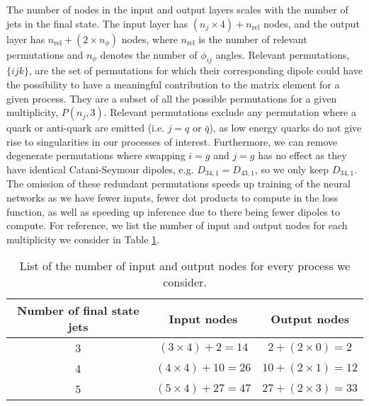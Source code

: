 \documentclass[main.tex]{subfiles}
\begin{document}
The number of nodes in the input and output layers scales with the number of jets in the final state.
The input layer has $(n_{j} \times 4) + n_{\mathrm{rel}}$ nodes, and the output layer has $n_{\mathrm{rel}} + (2 \times n_{\phi})$ nodes, where $n_{\mathrm{rel}}$ is the number of relevant permutations and $n_{\phi}$ denotes the number of $\phi_{ij}$ angles.
Relevant permutations, ${\{ijk\}}$, are the set of permutations for which their corresponding dipole could have the possibility to have a meaningful contribution to the matrix element for a given process.
They are a subset of all the possible permutations for a given multiplicity, $P(n_{j}, 3)$.
Relevant permutations exclude any permutation where a quark or anti-quark are emitted (i.e. $j = q$ or $\bar{q}$), as low energy quarks do not give rise to singularities in our processes of interest.
Furthermore, we can remove degenerate permutations where swapping $i=g$ and $j=g$ has no effect as they have identical Catani-Seymour dipoles, e.g. $D_{34, 1} = D_{43, 1}$, so we only keep $D_{34, 1}$.
The omission of these redundant permutations speeds up training of the neural networks as we have fewer inputs, fewer dot products to compute in the loss function, as well as speeding up inference due to there being fewer dipoles to compute.
For reference, we list the number of input and output nodes for each multiplicity we consider in Table \ref{table:nodes}.

\begin{table}
    \centering
    \begin{tabular}{|c|c|c|}
        \hline
        Number of final state jets & Input nodes & Output nodes \\
        \hline
        3 & $(3 \times 4) + 2  = 14$ & $2 + (2 \times 0)  = 2$   \\
        4 & $(4 \times 4) + 10 = 26$ & $10 + (2 \times 1) = 12$ \\
        5 & $(5 \times 4) + 27 = 47$ & $27 + (2 \times 3) = 33$ \\
        \hline
    \end{tabular}
    \caption{List of the number of input and output nodes for every process we consider.}
    \label{table:nodes}
\end{table}
\end{document}
